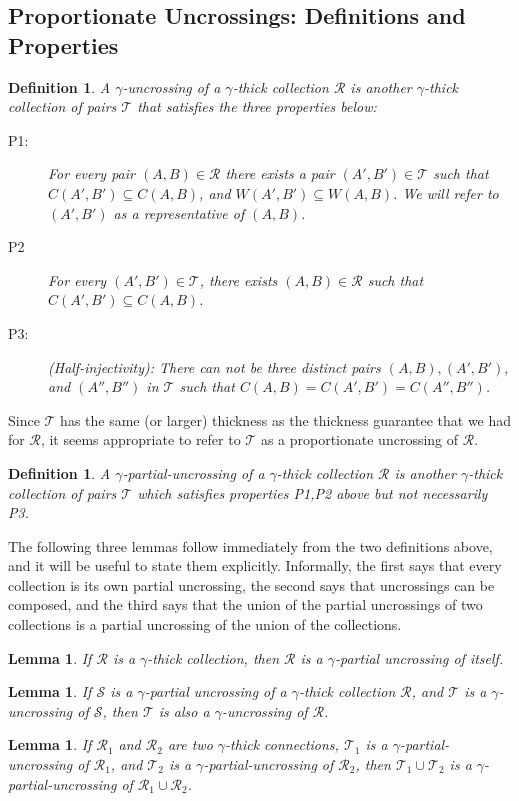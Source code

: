 \documentclass[11pt]{article}
\newtheorem{lemma}[theorem]{Lemma}
\newtheorem{definition}[theorem]{Definition}
\newcommand{\coll}{{\mathcal R}}
\newcommand{\colltwo}{{\mathcal T}}
\newcommand{\collpart}{{\mathcal S}}
\begin{document}
\subsection{Proportionate Uncrossings: Definitions and Properties}
\label{sec:define-proportionate}
\begin{definition}
\label{define:uncross}
A $\gamma$-uncrossing of a $\gamma$-thick collection $\coll$ is another
$\gamma$-thick collection of pairs $\colltwo$ that satisfies the three
properties below:
\begin{description}
\item[P1:] For every pair $(A,B) \in \coll$ there exists a pair $(A',B') \in
  \colltwo$ such that $C(A',B') \subseteq C(A,B)$, and $W(A',B') \subseteq
  W(A,B)$. We will refer to $(A',B')$ as a representative of $(A,B)$.
\item[P2] For every $(A',B')\in \colltwo$, there exists $(A,B)\in\coll$ such
    that $C(A',B')\subseteq C(A,B)$.
  \item[P3:] {\em (Half-injectivity):} There can not be three distinct pairs
    $(A,B), (A',B'),$ and $(A'',B'')$ in $\colltwo$ such that $C(A, B) =
    C(A',B') = C(A'',B'')$.
\end{description}
\end{definition}

Since $\colltwo$ has the same (or larger) thickness as the thickness guarantee
that we had for $\coll$, it seems appropriate to refer to $\colltwo$ as a
proportionate uncrossing of $\coll$.

\begin{definition}
  \label{define:partial}
  A $\gamma$-partial-uncrossing of a $\gamma$-thick collection $\coll$ is
  another $\gamma$-thick collection of pairs $\colltwo$ which satisfies
  properties P1,P2 above but not necessarily P3.
\end{definition}
The following three lemmas follow immediately from the two definitions above,
and it will be useful to state them explicitly. Informally, the first says
that every collection is its own partial uncrossing, the second says that
uncrossings can be composed, and the third says that the union of the partial
uncrossings of two collections is a partial uncrossing of the union of the
collections.
\begin{lemma}
  \label{lem:self-uncross}
  If $\coll$ is a $\gamma$-thick collection, then $\coll$ is a
  $\gamma$-partial uncrossing of itself.
\end{lemma}
\begin{lemma}
\label{lem:compose}
If $\collpart$ is a $\gamma$-partial uncrossing of a $\gamma$-thick collection
$\coll$, and $\colltwo$ is a $\gamma$-uncrossing of $\collpart$, then
$\colltwo$ is also a $\gamma$-uncrossing of $\coll$.
\end{lemma}
\begin{lemma}
  \label{lem:union}
  If $\coll_1$ and $\coll_2$ are two $\gamma$-thick connections, $\colltwo_1$
  is a $\gamma$-partial-uncrossing of $\coll_1$, and $\colltwo_2$ is a
  $\gamma$-partial-uncrossing of $\coll_2$, then $\colltwo_1 \cup \colltwo_2$
  is a $\gamma$-partial-uncrossing of $\coll_1 \cup \coll_2$.
\end{lemma}
\end{document}
